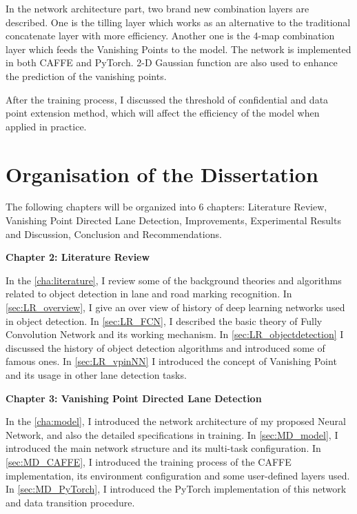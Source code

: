 \begin{spacing}{1.5}
In the network architecture part, two brand new combination layers are described. One is the tilling layer which works as an alternative to the traditional concatenate layer with more efficiency. Another one is the 4-map combination layer which feeds the Vanishing Points to the model. The network is implemented in both CAFFE and PyTorch. 2-D Gaussian function are also used to enhance the prediction of the vanishing points.

After the training process, I discussed the threshold of confidential and data point extension method, which will affect the efficiency of the model when applied in practice.

\section{Organisation of the Dissertation}
\label{sec:IN_organisation}

The following chapters will be organized into 6 chapters: Literature Review, Vanishing Point Directed Lane Detection, Improvements, Experimental Results and Discussion, Conclusion and Recommendations.

{\large\textbf{Chapter 2: Literature Review}}

In the \autoref{cha:literature}, I review some of the background theories and algorithms related to object detection in lane and road marking recognition. In \autoref{sec:LR_overview}, I give an over view of history of deep learning networks used in object detection. In \autoref{sec:LR_FCN}, I described the basic theory of Fully Convolution Network and its working mechanism. In \autoref{sec:LR_objectdetection} I discussed the history of object detection algorithms and introduced some of famous ones. In \autoref{sec:LR_vpinNN} I introduced the concept of Vanishing Point and its usage in other lane detection tasks.

{\large\textbf{Chapter 3: Vanishing Point Directed Lane Detection}}

In the \autoref{cha:model}, I introduced the network architecture of my proposed Neural Network, and also the detailed specifications in training. In \autoref{sec:MD_model}, I introduced the main network structure and its multi-task configuration. In \autoref{sec:MD_CAFFE}, I introduced the training process of the CAFFE implementation, its environment configuration and some user-defined layers used. In \autoref{sec:MD_PyTorch}, I introduced the PyTorch implementation of this network and data transition procedure.


\end{spacing}
